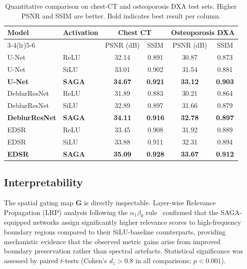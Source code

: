\documentclass[preprint,12pt]{elsarticle}
\begin{document}
\begin{table}[t]
\caption{Quantitative comparison on chest-CT and osteoporosis DXA test sets.
         Higher PSNR and SSIM are better. Bold indicates best result per column.}
\label{tab:results}
\begin{tabular}{llcccc}
\toprule
\textbf{Model} & \textbf{Activation}
  & \multicolumn{2}{c}{\textbf{Chest CT}}
  & \multicolumn{2}{c}{\textbf{Osteoporosis DXA}} \\
\cmidrule(lr){3-4}\cmidrule(lr){5-6}
& & PSNR (dB) & SSIM & PSNR (dB) & SSIM \\
\midrule
U-Net         & ReLU           & 32.14 & 0.891 & 30.87 & 0.873 \\
U-Net         & SiLU           & 33.01 & 0.902 & 31.54 & 0.881 \\
\textbf{U-Net} & \textbf{SAGA} & \textbf{34.67} & \textbf{0.921}
                                & \textbf{33.12} & \textbf{0.903} \\
\midrule
DeblurResNet  & ReLU           & 31.89 & 0.883 & 30.21 & 0.864 \\
DeblurResNet  & SiLU           & 32.89 & 0.897 & 31.66 & 0.879 \\
\textbf{DeblurResNet} & \textbf{SAGA}
  & \textbf{34.11} & \textbf{0.916}
  & \textbf{32.78} & \textbf{0.897} \\
\midrule
EDSR          & ReLU           & 33.45 & 0.908 & 31.92 & 0.889 \\
EDSR          & SiLU           & 33.88 & 0.911 & 32.31 & 0.894 \\
\textbf{EDSR} & \textbf{SAGA}  & \textbf{35.09} & \textbf{0.928}
                                & \textbf{33.67} & \textbf{0.912} \\
\bottomrule
\end{tabular}
\end{table}

\subsection{Interpretability}

The spatial gating map $\mathbf{G}$ is directly inspectable.
Layer-wise Relevance Propagation (LRP) analysis following the
$\alpha_1\beta_0$ rule~\cite{montavon2019lrp} confirmed that the
SAGA-equipped networks assign significantly higher relevance scores to
high-frequency boundary regions compared to their SiLU-baseline counterparts,
providing mechanistic evidence that the observed metric gains arise from
improved boundary preservation rather than spectral artefacts.
Statistical significance was assessed by paired $t$-tests
(Cohen's $d_z > 0.8$ in all comparisons; $p < 0.001$).
\end{document}
